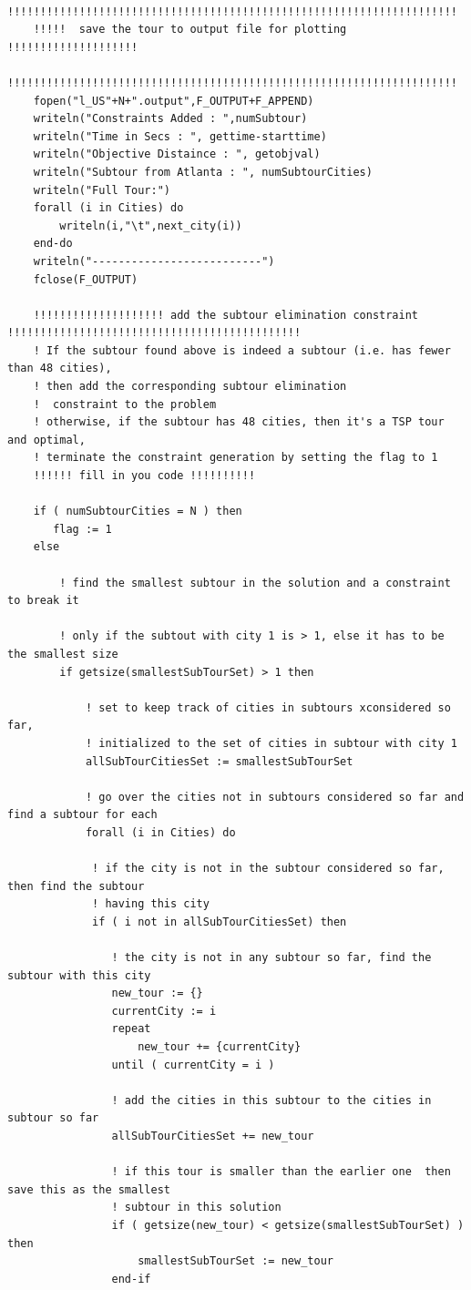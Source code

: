 \documentclass[twoside,12pt]{article}
\begin{document}
\begin{verbatim}
	!!!!!!!!!!!!!!!!!!!!!!!!!!!!!!!!!!!!!!!!!!!!!!!!!!!!!!!!!!!!!!!!!!!!!
	!!!!!  save the tour to output file for plotting !!!!!!!!!!!!!!!!!!!!
	!!!!!!!!!!!!!!!!!!!!!!!!!!!!!!!!!!!!!!!!!!!!!!!!!!!!!!!!!!!!!!!!!!!!!
	fopen("l_US"+N+".output",F_OUTPUT+F_APPEND)
	writeln("Constraints Added : ",numSubtour)
	writeln("Time in Secs : ", gettime-starttime)
	writeln("Objective Distaince : ", getobjval)
	writeln("Subtour from Atlanta : ", numSubtourCities)
	writeln("Full Tour:")
	forall (i in Cities) do
		writeln(i,"\t",next_city(i))
	end-do
	writeln("--------------------------")
	fclose(F_OUTPUT)
	
	!!!!!!!!!!!!!!!!!!!! add the subtour elimination constraint !!!!!!!!!!!!!!!!!!!!!!!!!!!!!!!!!!!!!!!!!!!!!
	! If the subtour found above is indeed a subtour (i.e. has fewer than 48 cities), 
	! then add the corresponding subtour elimination
	!  constraint to the problem
	! otherwise, if the subtour has 48 cities, then it's a TSP tour and optimal, 
	! terminate the constraint generation by setting the flag to 1
	!!!!!! fill in you code !!!!!!!!!!
	
	if ( numSubtourCities = N ) then
	   flag := 1
	else

		! find the smallest subtour in the solution and a constraint to break it
			
		! only if the subtout with city 1 is > 1, else it has to be the smallest size
		if getsize(smallestSubTourSet) > 1 then
			
			! set to keep track of cities in subtours xconsidered so far,
			! initialized to the set of cities in subtour with city 1
			allSubTourCitiesSet := smallestSubTourSet
			
			! go over the cities not in subtours considered so far and find a subtour for each
			forall (i in Cities) do
			
			 ! if the city is not in the subtour considered so far, then find the subtour
			 ! having this city
			 if ( i not in allSubTourCitiesSet) then
				
				! the city is not in any subtour so far, find the subtour with this city
				new_tour := {}
				currentCity := i
				repeat
					new_tour += {currentCity}
				until ( currentCity = i ) 
				
				! add the cities in this subtour to the cities in subtour so far
				allSubTourCitiesSet += new_tour
				
				! if this tour is smaller than the earlier one  then save this as the smallest
				! subtour in this solution
				if ( getsize(new_tour) < getsize(smallestSubTourSet) ) then
					smallestSubTourSet := new_tour
				end-if
				

\end{verbatim}
\end{document}
